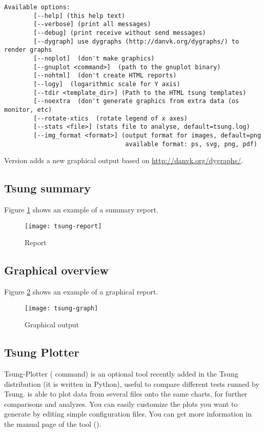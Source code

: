 \documentclass{TSUNG-en}
\begin{document}
\begin{Verbatim}
Available options:
        [--help] (this help text)
        [--verbose] (print all messages)
        [--debug] (print receive without send messages)
        [--dygraph] use dygraphs (http://danvk.org/dygraphs/) to render graphs
        [--noplot]  (don't make graphics)
        [--gnuplot <command>]  (path to the gnuplot binary)
        [--nohtml]  (don't create HTML reports)
        [--logy]  (logarithmic scale for Y axis)
        [--tdir <template_dir>] (Path to the HTML tsung templates)
        [--noextra  (don't generate graphics from extra data (os monitor, etc)
        [--rotate-xtics  (rotate legend of x axes)
        [--stats <file>] (stats file to analyse, default=tsung.log)
        [--img_format <format>] (output format for images, default=png
                                 available format: ps, svg, png, pdf)
\end{Verbatim}

Version  adds a new graphical output based on
\url{http://danvk.org/dygraphs/}.

\subsection{Tsung summary}
Figure \ref{fig:report} shows an example of a summary report.
\begin{figure}[htb]
  \begin{center}
    \texttt{[image: tsung-report]}
    \end{center}
      \caption{Report}
    \label{fig:report}
\end{figure}

\subsection{Graphical overview}

Figure \ref{fig:graph} shows an example of a graphical report.

\begin{figure}[htb]
  \begin{center}
    \texttt{[image: tsung-graph]}
    \end{center}
      \caption{Graphical output}
    \label{fig:graph}
\end{figure}
\subsection{Tsung Plotter}
Tsung-Plotter ( command) is an optional tool recently
added in the Tsung distribution (it is written in Python), useful to
compare different tests runned by Tsung.  is able to
plot data from several  files onto the same charts,
for further comparisons and analyzes. You can easily customize the
plots you want to generate by editing simple configuration files. You
can get more information in the manual page of the tool ().
\end{document}
